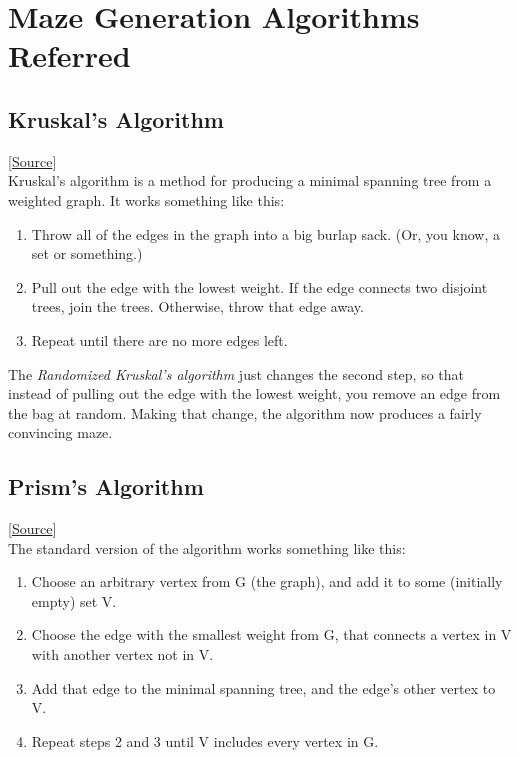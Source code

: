 \documentclass{article}
\begin{document}
\section{Maze Generation Algorithms Referred}
\label{maze_algs}
\subsection*{Kruskal's Algorithm}
[\href{https://weblog.jamisbuck.org/2011/1/3/maze-generation-kruskal-s-algorithm}{Source}]\\
Kruskal's algorithm is a method for producing a minimal spanning tree from a weighted graph. It works something like this:

\begin{enumerate}
    \item Throw all of the edges in the graph into a big burlap sack. (Or, you know, a set or something.)
    \item Pull out the edge with the lowest weight. If the edge connects two disjoint trees, join the trees. Otherwise, throw that edge away.
    \item Repeat until there are no more edges left.
\end{enumerate}

The {\it Randomized Kruskal's algorithm} just changes the second step, so that instead of pulling out the edge with the lowest weight, you remove an edge from the bag at random. Making that change, the algorithm now produces a fairly convincing maze.

\subsection*{Prism's Algorithm}
[\href{https://weblog.jamisbuck.org/2011/1/10/maze-generation-prim-s-algorithm}{Source}]\\
The standard version of the algorithm works something like this:
\begin{enumerate}
    \item Choose an arbitrary vertex from G (the graph), and add it to some (initially empty) set V.
    \item Choose the edge with the smallest weight from G, that connects a vertex in V with another vertex not in V.
    \item Add that edge to the minimal spanning tree, and the edge's other vertex to V.
    \item Repeat steps 2 and 3 until V includes every vertex in G.
\end{enumerate}
\end{document}
